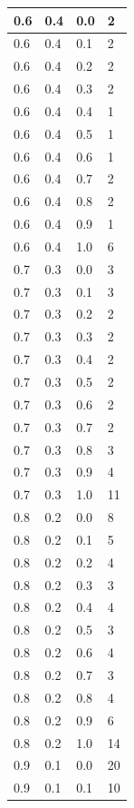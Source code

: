 \documentclass{bmstu}[a4paper]
\begin{document}
\begin{longtable}{|p{}|p{}|p{}|p{}|}
	0.6 &  0.4 &  0.0 &     2 \\\hline
	0.6 &  0.4 &  0.1 &     2 \\\hline
	0.6 &  0.4 &  0.2 &     2 \\\hline
	0.6 &  0.4 &  0.3 &     2 \\\hline
	0.6 &  0.4 &  0.4 &     1 \\\hline
	0.6 &  0.4 &  0.5 &     1 \\\hline
	0.6 &  0.4 &  0.6 &     1 \\\hline
	0.6 &  0.4 &  0.7 &     2 \\\hline
	0.6 &  0.4 &  0.8 &     2 \\\hline
	0.6 &  0.4 &  0.9 &     1 \\\hline
	0.6 &  0.4 &  1.0 &     6 \\\hline
	0.7 &  0.3 &  0.0 &     3 \\\hline
	0.7 &  0.3 &  0.1 &     3 \\\hline
	0.7 &  0.3 &  0.2 &     2 \\\hline
	0.7 &  0.3 &  0.3 &     2 \\\hline
	0.7 &  0.3 &  0.4 &     2 \\\hline
	0.7 &  0.3 &  0.5 &     2 \\\hline
	0.7 &  0.3 &  0.6 &     2 \\\hline
	0.7 &  0.3 &  0.7 &     2 \\\hline
	0.7 &  0.3 &  0.8 &     3 \\\hline
	0.7 &  0.3 &  0.9 &     4 \\\hline
	0.7 &  0.3 &  1.0 &    11 \\\hline
	0.8 &  0.2 &  0.0 &     8 \\\hline
	0.8 &  0.2 &  0.1 &     5 \\\hline
	0.8 &  0.2 &  0.2 &     4 \\\hline
	0.8 &  0.2 &  0.3 &     3 \\\hline
	0.8 &  0.2 &  0.4 &     4 \\\hline
	0.8 &  0.2 &  0.5 &     3 \\\hline
	0.8 &  0.2 &  0.6 &     4 \\\hline
	0.8 &  0.2 &  0.7 &     3 \\\hline
	0.8 &  0.2 &  0.8 &     4 \\\hline
	0.8 &  0.2 &  0.9 &     6 \\\hline
	0.8 &  0.2 &  1.0 &    14 \\\hline
	0.9 &  0.1 &  0.0 &    20 \\\hline
	0.9 &  0.1 &  0.1 &    10 \\\hline

\end{longtable}
\end{document}
